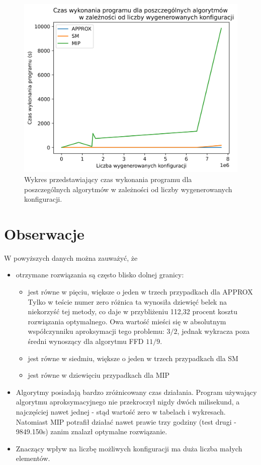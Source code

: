 \begin{figure}[H]
	\begin{center}
		\includegraphics[width=12cm]{plots/time_configs}
		\caption{Wykres przedstawiający czas wykonania programu dla poszczególnych algorytmów w zależności od liczby wygenerowanych konfiguracji.}
	\end{center}
\end{figure}

\newpage
\section{Obserwacje}

W powyższych danych można zauważyć, że
\begin{itemize}
	\item otrzymane rozwiązania są często blisko dolnej granicy:
	\begin{itemize}
		\item jest równe w pięciu, większe o jeden w trzech przypadkach dla APPROX \\
		Tylko w teście numer zero różnica ta wynosiła dziewięć belek na niekorzyść tej metody, co daje w przybliżeniu 112,32 procent kosztu rozwiązania optymalnego. Owa wartość mieści się w absolutnym współczynniku aproksymacji tego problemu: $3/2$, jednak wykracza poza średni wynoszący dla algorytmu FFD $11/9$.
		\item jest równe w siedmiu, większe o jeden w trzech przypadkach dla SM
		\item jest równe w dziewięciu przypadkach dla MIP
	\end{itemize}
	\item Algorytmy posiadają bardzo zróżnicowany czas działania.
	Program używający algorytmu aproksymacyjnego nie przekroczył nigdy dwóch milisekund, a najczęściej nawet jednej - stąd wartość zero w tabelach i wykresach. Natomiast MIP potrafił działać nawet prawie trzy godziny (test drugi - 9849.150s) zanim znalazł optymalne rozwiązanie. 
	\item Znaczący wpływ na liczbę możliwych konfiguracji ma duża liczba małych elementów.
	
\end{itemize}

